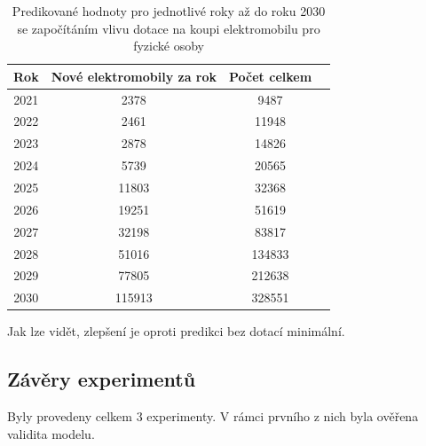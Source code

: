 \documentclass[14pt]{extarticle}
\begin{document}
    \begin{table}[H]
    \centering
    \captionsetup{justification=centering}
        \begin{tabular}{|c|c|c|c|}
        \hline
                 \textbf{Rok} & \textbf{Nové elektromobily za rok} & \textbf{Počet celkem} \\ \hline
                   2021         & 2378                                          & 9487                                     \\ \hline
                  2022         & 2461                                          & 11948                                    \\ \hline
                  2023         & 2878                                          & 14826                                    \\ \hline
                  2024         & 5739                                          & 20565                                    \\ \hline
                  2025         & 11803                                         & 32368                                    \\ \hline
                 2026         & 19251                                         & 51619                                    \\ \hline
                  2027         & 32198                                         & 83817                                   \\ \hline
                  2028         & 51016                                         & 134833                                   \\ \hline
                  2029         & 77805                                         & 212638                                   \\ \hline
                  2030         & 115913                                        & 328551    
                  \\ \hline
        \end{tabular}
        \caption{Predikované hodnoty pro jednotlivé roky až do roku 2030 se započítáním vlivu dotace na koupi elektromobilu pro fyzické osoby}
\end{table}
    
    
    Jak lze vidět, zlepšení je oproti predikci bez dotací minimální.
    
    \subsection{Závěry experimentů}
    Byly provedeny celkem 3 experimenty. V rámci prvního z nich byla ověřena validita modelu. 
    
\end{document}
